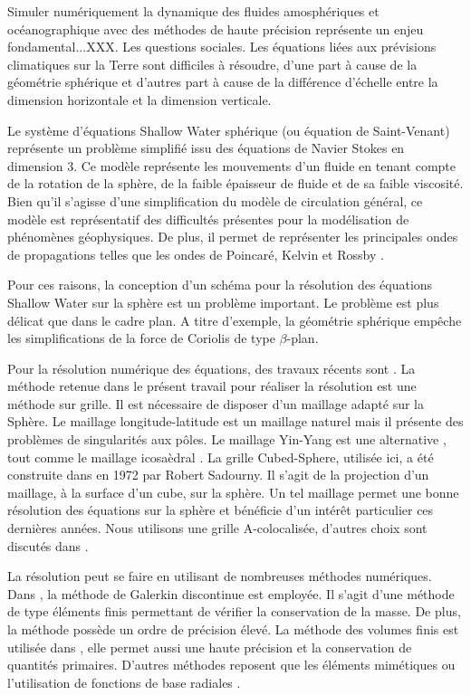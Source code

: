 Simuler numériquement la dynamique des fluides amosphériques et océanographique avec des méthodes de haute précision représente un enjeu fondamental...XXX. Les questions sociales. Les équations liées aux prévisions climatiques sur la Terre sont difficiles à résoudre, d'une part à cause de la géométrie sphérique et d'autres part à cause de la différence d'échelle entre la dimension horizontale et la dimension verticale. 

Le système d'équations Shallow Water sphérique (ou équation de Saint-Venant) représente un problème simplifié issu des équations de Navier Stokes en dimension 3. Ce modèle représente les mouvements d'un fluide en tenant compte de la rotation de la sphère, de la faible épaisseur de fluide et de sa faible viscosité. Bien qu'il s'agisse d'une simplification du modèle de circulation général, ce modèle est représentatif des difficultés présentes pour la modélisation de phénomènes géophysiques. De plus, il permet de représenter les principales ondes de propagations telles que les ondes de Poincaré, Kelvin et Rossby \cite{Paldor2015}.

Pour ces raisons, la conception d'un schéma pour la résolution des équations Shallow Water sur la sphère est un problème important. Le problème est plus délicat que dans le cadre plan. A titre d'exemple, la géométrie sphérique empêche les simplifications de la force de Coriolis de type $\beta$-plan.

Pour la résolution numérique des équations, des travaux récents sont \cite{Eldred2015, Nair2010, Qaddouri2012, Ullrich2011}. La méthode retenue dans le présent travail pour réaliser la résolution est une méthode sur grille. Il est nécessaire de disposer d'un maillage adapté sur la Sphère. Le maillage longitude-latitude est un maillage naturel mais il présente des problèmes de singularités aux pôles. Le maillage Yin-Yang est une alternative \cite{Kageyama2004, Li2008}, tout comme le maillage icosaèdral \cite{Stuhne1999}. La grille Cubed-Sphere, utilisée ici, a été construite dans \cite{Sadourny1972} en 1972 par Robert Sadourny. Il s'agit de la projection d'un maillage, à la surface d'un cube, sur la sphère. Un tel maillage permet une bonne résolution des équations sur la sphère \cite{Ronchi1996} et bénéficie d'un intérêt particulier ces dernières années. Nous utilisons une grille A-colocalisée, d'autres choix sont discutés dans \cite{Eldred2015}.

La résolution peut se faire en utilisant de nombreuses méthodes numériques. Dans \cite{Nair2010}, la méthode de Galerkin discontinue est employée. Il s'agit d'une méthode de type éléments finis permettant de vérifier la conservation de la masse. De plus, la méthode possède un ordre de précision élevé. La méthode des volumes finis est utilisée dans \cite{Chen2008,Ullrich2011}, elle permet aussi une haute précision et la conservation de quantités primaires. D'autres méthodes reposent que les éléments mimétiques \cite{Lauritzen2010} ou l'utilisation de fonctions  de base radiales \cite{Flyer2011}.

